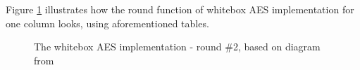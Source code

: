 \documentclass[11pt,oneside,final]{fithesis2}
\begin{document}
    Figure \ref{fig:wbaes} illustrates how the round function of whitebox AES implementation for one column looks, using aforementioned tables.
    \begin{figure}
    \begin{center}
    \leavevmode
    \centerline{}
    \end{center}
    \caption{The whitebox AES implementation - round \#2, based on diagram from~\citep{Muir_atutorial}}
    \label{fig:wbaes}
    \end{figure}
\end{document}
